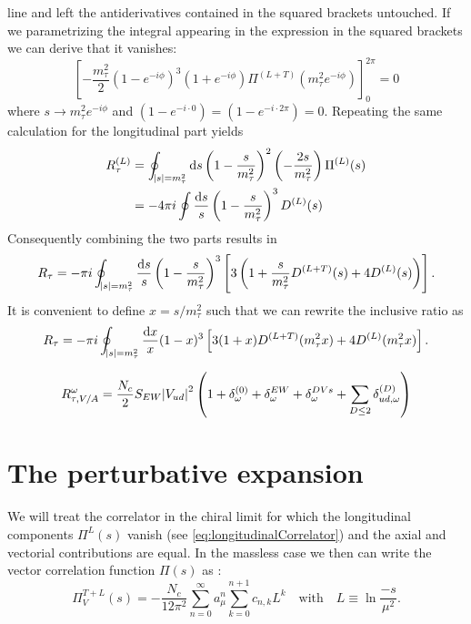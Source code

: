\documentclass[../../index.tex]{subfiles}
\begin{document}
line and left the antiderivatives contained in the squared brackets untouched.
If we parametrizing the integral appearing in the expression in the squared
brackets we can derive that it vanishes:
\begin{equation}
    \left[ -\frac{m_\tau^2}{2} \left( 1 - e^{-i \phi} \right)^3 \left( 1 + e^{-i \phi} \right) \Pi^{(L+T)}(m_\tau^2 e^{-i \phi}) \right]_0^{2\pi} = 0
\end{equation}
where $s \to m_\tau^2 e^{-i \phi}$ and $(1 - e^{-i \cdot 0}) = (1 - e^{-i \cdot 2 \pi})
= 0$.
Repeating the same calculation for the longitudinal part yields
\begin{equation}
  \begin{split}
    R_\tau^{(L)} &= \oint_{\abs{s}=m_\tau^2} \dif s \left( 1 - \frac{s}{m_\tau^2} \right)^2 \left( - \frac{2 s}{m_\tau^2} \right) \Pi^{(L)}(s) \\
    &= - 4 \pi i \oint \frac{\dif s}{s} \left( 1 - \frac{s}{m_\tau^2} \right)^3 D^{(L)}(s)
  \end{split}
\end{equation}
Consequently combining the two parts results in
\begin{equation}
  R_\tau = - \pi i \oint_{\abs{s}=m_\tau^2} \frac{\dif s}{s} \left( 1 - \frac{s}{m_\tau^2} \right)^3 \left[ 3 \left( 1 + \frac{s}{m_\tau^2} D^{(L+T)}(s) + 4 D^{(L)}(s) \right) \right].
\end{equation}
It is convenient to define $x=s/m_\tau^2$ such that we can rewrite the inclusive
ratio as
\begin{equation}
  \label{eq:rTauFinal}
  R_\tau = - \pi i \oint_{\abs{s}=m_\tau^2} \frac{\dif x}{x} (1 - x)^3 \left[ 3 (1 + x) D^{(L+T)}(m_\tau^2 x) + 4 D^{(L)}(m_\tau^2 x)  \right].
\end{equation}

\begin{equation}
  \label{eq:rTauContributions}
  R_{\tau,V/A}^\omega = \frac{N_c}{2}S_{EW} \abs{V_{ud}}^2 \left( 1 + \delta_{\omega}^{(0)} + \delta^{EW}_{\omega} + \delta_{\omega}^{DVs} + \sum_{D \leq 2} \delta^{(D)}_{ud,\omega} \right)
\end{equation}

\section{The perturbative expansion}
We will treat the correlator in the chiral limit for which the longitudinal
components $\Pi^{L}(s)$ vanish (see \cref{eq:longitudinalCorrelator}) and the
axial and vectorial contributions are equal. In the massless case we then
can write the vector correlation function $\Pi(s)$ as \cite{Beneke2008}:
\begin{equation}
  \label{eq:correlatorExpansion}
  \Pi_V^{T+L}(s) = - \frac{N_c}{12 \pi^2} \sum_{n=0}^\infty a_\mu^n \sum_{k=0}^{n+1} c_{n,k} L^{k} \quad \text{with} \quad L \equiv \ln \frac{-s}{\mu^2}.
\end{equation}
\end{document}

